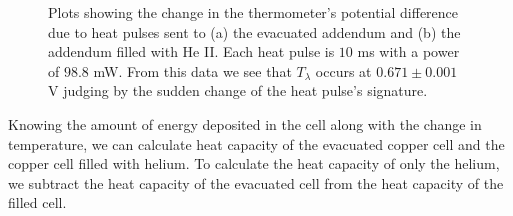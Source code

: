 \begin{figure}[htbp]
\begin{center}
\hspace{-1mm}
\vspace{-2mm}
\vspace{-2mm}
\caption{\small{Plots showing the change in the thermometer's potential difference due to heat pulses sent to (a) the evacuated addendum and (b) the addendum filled with He II.  Each heat pulse is $10$ ms with a power of $98.8$ mW.  From this data we see that $T_{\lambda}$ occurs at $0.671 \pm 0.001$ V judging by the sudden change of the heat pulse's signature.}}
\label{fig:rawdata}
\end{center}
\end{figure}

Knowing the amount of energy deposited in the cell along with the change in temperature, we can calculate heat capacity of the evacuated copper cell and the copper cell filled with helium. To calculate the heat capacity of only the helium, we subtract the heat capacity of the evacuated cell from the heat capacity of the filled cell.
